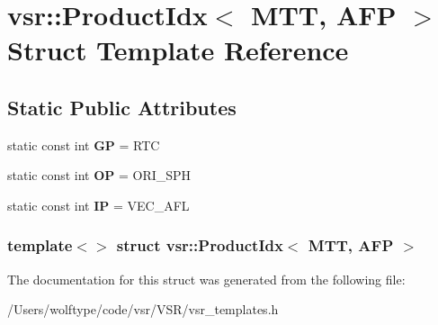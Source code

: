 \hypertarget{structvsr_1_1_product_idx_3_01_m_t_t_00_01_a_f_p_01_4}{\section{vsr\-:\-:Product\-Idx$<$ M\-T\-T, A\-F\-P $>$ Struct Template Reference}
\label{structvsr_1_1_product_idx_3_01_m_t_t_00_01_a_f_p_01_4}
}
\subsection*{Static Public Attributes}
\begin{DoxyCompactItemize}
\item 
\hypertarget{structvsr_1_1_product_idx_3_01_m_t_t_00_01_a_f_p_01_4_af1bc95eda6dbffa57045d85741d28831}{static const int {\bfseries G\-P} = R\-T\-C}\label{structvsr_1_1_product_idx_3_01_m_t_t_00_01_a_f_p_01_4_af1bc95eda6dbffa57045d85741d28831}

\item 
\hypertarget{structvsr_1_1_product_idx_3_01_m_t_t_00_01_a_f_p_01_4_af79b9c57bf5839be5308588853f6e54b}{static const int {\bfseries O\-P} = O\-R\-I\-\_\-\-S\-P\-H}\label{structvsr_1_1_product_idx_3_01_m_t_t_00_01_a_f_p_01_4_af79b9c57bf5839be5308588853f6e54b}

\item 
\hypertarget{structvsr_1_1_product_idx_3_01_m_t_t_00_01_a_f_p_01_4_ac354971ce703bf6b394078c8e042da91}{static const int {\bfseries I\-P} = V\-E\-C\-\_\-\-A\-F\-L}\label{structvsr_1_1_product_idx_3_01_m_t_t_00_01_a_f_p_01_4_ac354971ce703bf6b394078c8e042da91}

\end{DoxyCompactItemize}
\subsubsection*{template$<$$>$ struct vsr\-::\-Product\-Idx$<$ M\-T\-T, A\-F\-P $>$}



The documentation for this struct was generated from the following file\-:\begin{DoxyCompactItemize}
\item 
/\-Users/wolftype/code/vsr/\-V\-S\-R/vsr\-\_\-templates.\-h\end{DoxyCompactItemize}
